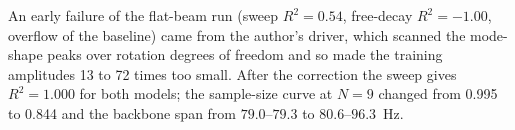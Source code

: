 An early failure of the flat-beam run (sweep $R^2=0.54$, free-decay $R^2=-1.00$, overflow of the baseline) came from the author's driver, which scanned the mode-shape peaks over rotation degrees of freedom and so made the training amplitudes 13 to 72 times too small. After the correction the sweep gives $R^2=1.000$ for both models; the sample-size curve at $N=9$ changed from 0.995 to 0.844 and the backbone span from $79.0$--$79.3$ to $80.6$--$96.3$~Hz.
